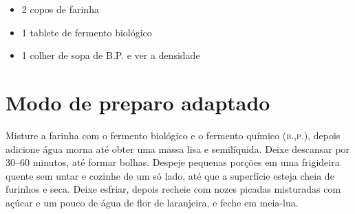 \begin{itemize}
\item 2 copos de farinha
\item 1 tablete de fermento biológico
\item 1 colher de sopa de B.P. e ver a densidade
\end{itemize}

\section{Modo de preparo adaptado}

Misture a farinha com o fermento biológico e o fermento químico (\textsc{b.,p.}), depois adicione água morna até obter uma massa lisa e semilíquida. Deixe descansar por 30--60 minutos, até formar bolhas. Despeje pequenas porções em uma frigideira quente sem untar e cozinhe de um só lado, até que a superfície esteja cheia de furinhos e seca. Deixe esfriar, depois recheie com nozes picadas misturadas com açúcar e um pouco de água de flor de laranjeira, e feche em meia-lua.